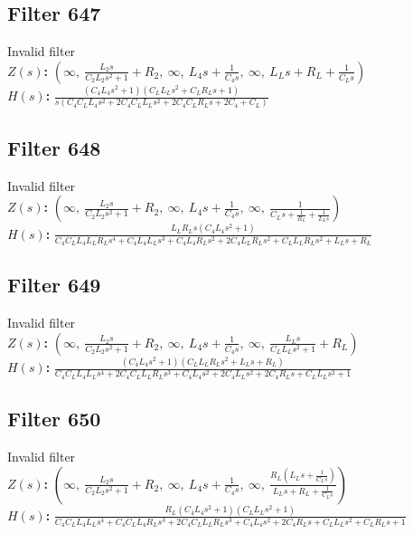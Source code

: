 \documentclass{article}
\begin{document}
\subsection*{Filter 647}
Invalid filter \\ 
\textbf{$Z(s)$:} $\left( \infty, \  \frac{L_{2} s}{C_{2} L_{2} s^{2} + 1} + R_{2}, \  \infty, \  L_{4} s + \frac{1}{C_{4} s}, \  \infty, \  L_{L} s + R_{L} + \frac{1}{C_{L} s}\right)$ \\ 
\textbf{$H(s)$:} $\frac{\left(C_{4} L_{4} s^{2} + 1\right) \left(C_{L} L_{L} s^{2} + C_{L} R_{L} s + 1\right)}{s \left(C_{4} C_{L} L_{4} s^{2} + 2 C_{4} C_{L} L_{L} s^{2} + 2 C_{4} C_{L} R_{L} s + 2 C_{4} + C_{L}\right)}$ \\ 
\subsection*{Filter 648}
Invalid filter \\ 
\textbf{$Z(s)$:} $\left( \infty, \  \frac{L_{2} s}{C_{2} L_{2} s^{2} + 1} + R_{2}, \  \infty, \  L_{4} s + \frac{1}{C_{4} s}, \  \infty, \  \frac{1}{C_{L} s + \frac{1}{R_{L}} + \frac{1}{L_{L} s}}\right)$ \\ 
\textbf{$H(s)$:} $\frac{L_{L} R_{L} s \left(C_{4} L_{4} s^{2} + 1\right)}{C_{4} C_{L} L_{4} L_{L} R_{L} s^{4} + C_{4} L_{4} L_{L} s^{3} + C_{4} L_{4} R_{L} s^{2} + 2 C_{4} L_{L} R_{L} s^{2} + C_{L} L_{L} R_{L} s^{2} + L_{L} s + R_{L}}$ \\ 
\subsection*{Filter 649}
Invalid filter \\ 
\textbf{$Z(s)$:} $\left( \infty, \  \frac{L_{2} s}{C_{2} L_{2} s^{2} + 1} + R_{2}, \  \infty, \  L_{4} s + \frac{1}{C_{4} s}, \  \infty, \  \frac{L_{L} s}{C_{L} L_{L} s^{2} + 1} + R_{L}\right)$ \\ 
\textbf{$H(s)$:} $\frac{\left(C_{4} L_{4} s^{2} + 1\right) \left(C_{L} L_{L} R_{L} s^{2} + L_{L} s + R_{L}\right)}{C_{4} C_{L} L_{4} L_{L} s^{4} + 2 C_{4} C_{L} L_{L} R_{L} s^{3} + C_{4} L_{4} s^{2} + 2 C_{4} L_{L} s^{2} + 2 C_{4} R_{L} s + C_{L} L_{L} s^{2} + 1}$ \\ 
\subsection*{Filter 650}
Invalid filter \\ 
\textbf{$Z(s)$:} $\left( \infty, \  \frac{L_{2} s}{C_{2} L_{2} s^{2} + 1} + R_{2}, \  \infty, \  L_{4} s + \frac{1}{C_{4} s}, \  \infty, \  \frac{R_{L} \left(L_{L} s + \frac{1}{C_{L} s}\right)}{L_{L} s + R_{L} + \frac{1}{C_{L} s}}\right)$ \\ 
\textbf{$H(s)$:} $\frac{R_{L} \left(C_{4} L_{4} s^{2} + 1\right) \left(C_{L} L_{L} s^{2} + 1\right)}{C_{4} C_{L} L_{4} L_{L} s^{4} + C_{4} C_{L} L_{4} R_{L} s^{3} + 2 C_{4} C_{L} L_{L} R_{L} s^{3} + C_{4} L_{4} s^{2} + 2 C_{4} R_{L} s + C_{L} L_{L} s^{2} + C_{L} R_{L} s + 1}$ \\ 
\end{document}
